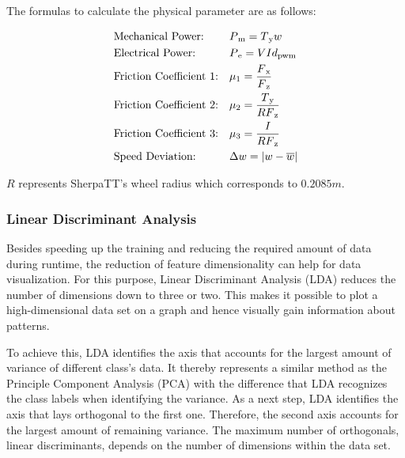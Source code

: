 \documentclass{article}
\begin{document}
The formulas to calculate the physical parameter are as follows:

  \begin{equation*}
    \begin{aligned}[c]
        & \text{Mechanical Power:} && P\textsubscript{m} = T\textsubscript{y} w \\
        & \text{Electrical Power:} && P\textsubscript{e} = V I d\textsubscript{pwm} \\
        & \text{Friction Coefficient 1:} && \mu \textsubscript{1} = \frac{F\textsubscript{x}}{F\textsubscript{z}} \\
        & \text{Friction Coefficient 2:} && \mu \textsubscript{2} = \frac{T\textsubscript{y}}{R  F\textsubscript{z}} \\ 
        & \text{Friction Coefficient 3:} && \mu \textsubscript{3} = \frac{I}{R F\textsubscript{z}} \\
        & \text{Speed Deviation:} && \Delta w = |w-\overline{w}| 
   \end{aligned}
 \end{equation*}

$R$ represents SherpaTT's wheel radius which corresponds to $0.2085m$.



\subsubsection{Linear Discriminant Analysis}
Besides speeding up the training and reducing the required amount of data during runtime, the reduction of feature dimensionality can help for data visualization. For this purpose, Linear Discriminant Analysis (LDA) reduces the number of dimensions down to three or two. This makes it possible to plot a high-dimensional data set on a graph and hence visually gain information about patterns. 

To achieve this, LDA identifies the axis that accounts for the largest amount of variance of different class's data. It thereby represents a similar method as the Principle Component Analysis (PCA) with the difference that LDA recognizes the class labels when identifying the variance. As a next step, LDA identifies the axis that lays orthogonal to the first one. Therefore, the second axis accounts for the largest amount of remaining variance. The maximum number of orthogonals, linear discriminants, depends on the number of dimensions within the data set.\cite{kuhr2021}
\end{document}
